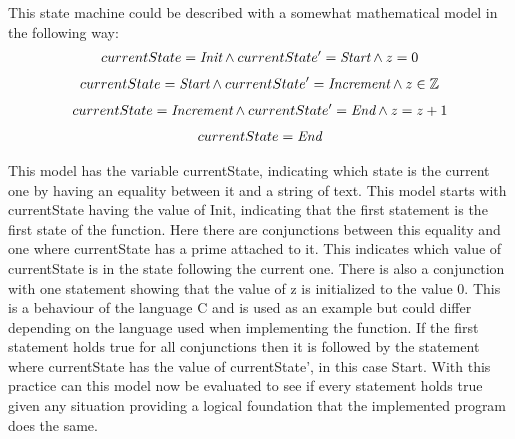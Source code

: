 \documentclass{article}
\begin{document}
This state machine could be described with a somewhat mathematical model in the following way:
\begin{displaymath}
\begin{split}
    currentState = \emph{Init}  \land  currentState' = \emph{Start} \land z = 0 
        \end{split}
\end{displaymath}
\begin{displaymath}
\begin{split}
    currentState = \emph{Start} \land currentState' = \emph{Increment} \land z \in \mathbb{Z} 
        \end{split}
\end{displaymath}
\begin{displaymath}
\begin{split}
    currentState = \emph{Increment} \land currentState' = \emph{End} \land z = z + 1
        \end{split}
\end{displaymath}
\begin{displaymath}
\begin{split}
    currentState = \emph{End} \\
    \end{split}
\end{displaymath}

This model has the variable currentState, indicating which state is the current one by having an equality between it and a string of text. This model starts with currentState having the value of Init, indicating that the first statement is the first state of the function. Here there are conjunctions between this equality and one where currentState has a prime attached to it. This indicates which value of currentState is in the state following the current one. There is also a conjunction with one statement showing that the value of z is initialized to the value 0. This is a behaviour of the language C and is used as an example but could differ depending on the language used when implementing the function. If the first statement holds true for all conjunctions then it is followed by the statement where currentState has the value of currentState', in this case Start.  With this practice can this model now be evaluated to see if every statement holds true given any situation providing a logical foundation that the implemented program does the same.  
\end{document}
